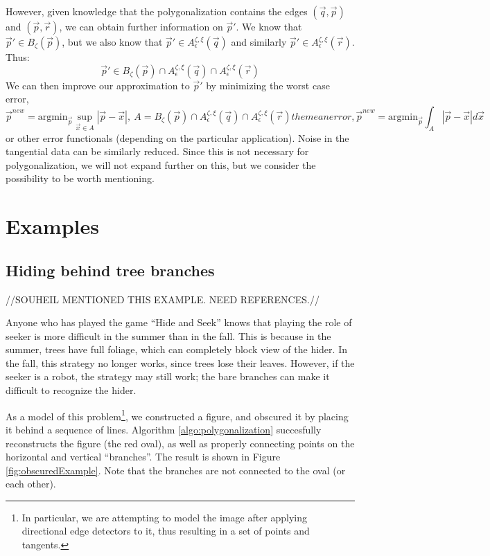 \documentclass{article}
\numberwithin{cntr}{section}
\numberwithin{equation}{section}
\newcommand{\abs}[1]{\left| #1 \right|}%
\newcommand{\vx}[0]{{\vec{x}}}
\newcommand{\vp}[0]{{\vec{p}}}
\newcommand{\vq}[0]{{\vec{q}}}
\newcommand{\vr}[0]{{\vec{r}}}
\newcommand{\ball}[2]{ { B_{#1}(#2) } }
\newcommand{\pointNoise}{{\zeta}}
\newcommand{\tanNoise}{{\xi}}
\newcommand{\nallowed}[2]{ { A^{\pointNoise, \tanNoise}_{#1}(#2) } }
\begin{document}
However, given knowledge that the polygonalization contains the edges $(\vq,\vp)$ and $(\vp,\vr)$, we can obtain further information on $\vp'$. We know that $\vp' \in \ball{\pointNoise}{\vp}$, but we also know that $\vp' \in \nallowed{\epsilon}{\vq}$ and similarly $\vp' \in \nallowed{\epsilon}{\vr}$. Thus:
\begin{equation}
  \label{eq:noisyFilteringFromAllowedRegions}
  \vp' \in \ball{\pointNoise}{\vp} \cap \nallowed{\epsilon}{\vq} \cap  \nallowed{\epsilon}{\vr}
\end{equation}
We can then improve our approximation to $\vp'$ by minimizing the worst case error,
\begin{subequations}
  \begin{equation}
    \vp^{new} = \textrm{argmin}_{\vp}  \sup_{\vx \in A} \abs{\vp - \vx}, ~ A = \ball{\pointNoise}{\vp} \cap \nallowed{\epsilon}{\vq} \cap  \nallowed{\epsilon}{\vr}
  \end{equation}
  the mean error,
  \begin{equation}
    \vp^{new} = \textrm{argmin}_{\vp}  \int_{A} \abs{\vp - \vx} d\vx
  \end{equation}
\end{subequations}
or other error functionals (depending on the particular application). Noise in the tangential data can be similarly reduced. Since this is not necessary for polygonalization,  we will not expand further on this, but we consider the possibility to be worth mentioning.

\section{Examples}

\subsection{Hiding behind tree branches}

//SOUHEIL MENTIONED THIS EXAMPLE. NEED REFERENCES.//

Anyone who has played the game ``Hide and Seek'' knows that playing the role of seeker is more difficult in the summer than in the fall. This is because in the summer, trees have full foliage, which can completely block view of the hider. In the fall, this strategy no longer works, since trees lose their leaves. However, if the seeker is a robot, the strategy may still work; the bare branches can make it difficult to recognize the hider.

As a model of this problem\footnote{In particular, we are attempting to model the image after applying directional edge detectors to it, thus resulting in a set of points and tangents.}, we constructed a figure, and obscured it by placing it behind a sequence of lines. Algorithm \ref{algo:polygonalization} succesfully reconstructs the figure (the red oval), as well as properly connecting points on the horizontal and vertical ``branches''. The result is shown in Figure \ref{fig:obscuredExample}. Note that the branches are not connected to the oval (or each other).
\end{document}
